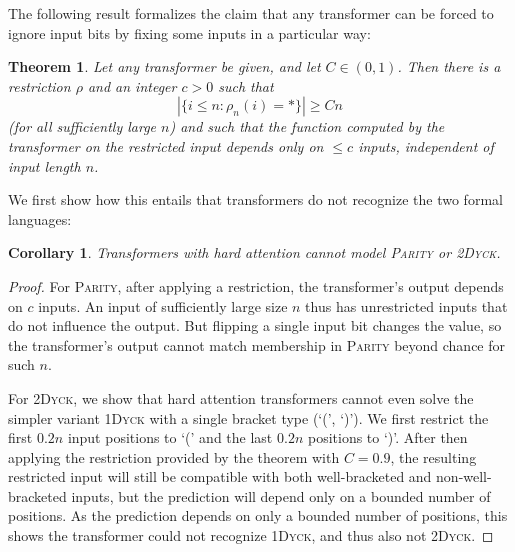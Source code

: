 \documentclass[11pt,a4paper]{article}
\newcounter{theorem}
\newtheorem{corollary}[theorem]{Corollary}
\newtheorem{thm}[theorem]{Theorem}
\begin{document}
The following result formalizes the claim that any transformer can be forced to ignore input bits by fixing some inputs in a particular way:
\begin{thm}\label{thm:hardmax-main}
Let any transformer be given, and let $C \in (0,1)$.
Then there is a restriction $\rho$ and an integer $c > 0$ such that 
$$|\{i \leq n: \rho_n(i) = *\}| \geq Cn$$
(for all sufficiently large $n$) and such that the function computed by the transformer on the restricted input depends only on $\leq c$ inputs, independent of input length $n$.
\end{thm}
We first show how this entails that transformers do not recognize the two formal languages:
\begin{corollary}
Transformers with hard attention cannot model \textsc{Parity} or \textsc{2Dyck}. %
\end{corollary}
\begin{proof}

For \textsc{Parity}, after applying a restriction, the transformer's output depends on $c$ inputs.
An input of sufficiently large size $n$ thus has unrestricted inputs that do not influence the output.
But flipping a single input bit changes the value, so the transformer's output cannot match membership in \textsc{Parity} beyond chance for such $n$.


For \textsc{2Dyck}, we show that hard attention transformers cannot even solve the simpler variant \textsc{1Dyck} with a single bracket type (`(', `)').
We first restrict the first $0.2n$ input positions to `(' and the last $0.2n$ positions to `)'.
After then applying the restriction provided by the theorem with $C=0.9$, the resulting restricted input will still be compatible with both well-bracketed and non-well-bracketed inputs, but the prediction will depend only on a bounded number of positions.
As the prediction depends on only a bounded number of positions, this shows the transformer could not recognize \textsc{1Dyck}, and thus also not \textsc{2Dyck}.
%
\end{proof}
\end{document}
